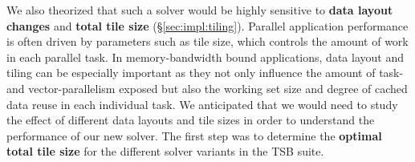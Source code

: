 \documentclass[10pt, conference, compsocconf]{IEEEtran}
\begin{document}
We also theorized that such a solver would be highly sensitive to
  \textbf{data layout changes} and
  \textbf{total tile size} (\S\ref{sec:impl:tiling}).
Parallel application performance is often driven by parameters such as 
  tile size, which controls the amount of work in each parallel task.
In memory-bandwidth bound applications, data layout and tiling can be
  especially important as they not only influence the amount of task- and
  vector-parallelism exposed but also the working set size and degree of cached
  data reuse in each individual task.
We anticipated that we would need to study the effect of different data layouts
  and tile sizes in order to understand the performance of our new solver.
The first step was to determine the \textbf{optimal total tile size} for the 
  different solver variants in the TSB suite.
\end{document}
